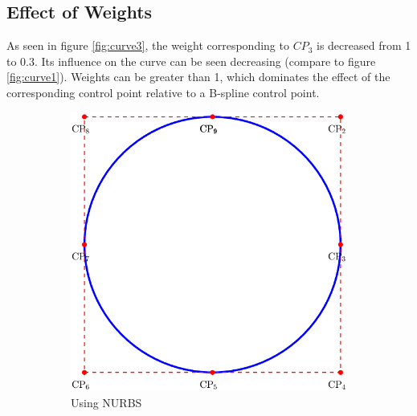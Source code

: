 \documentclass[12pt, a4paper]{report}
\begin{document}
\subsection{Effect of Weights}
As seen in figure \ref{fig:curve3}, the weight corresponding to $CP_3$ is decreased from 1 to 0.3. Its influence on the curve can be seen decreasing (compare to figure \ref{fig:curve1}). Weights can be greater than 1, which dominates the effect of the corresponding control point relative to a B-spline control point.
\begin{figure}[H]
\centering
\begin{subfigure}{0.4\textwidth}
  \centering
  \includegraphics[width=\linewidth]{Images/cir1.png}
  \caption{Using NURBS}
  \label{fig:simple_cir}
\end{subfigure}\hfill
\begin{subfigure}{0.4\textwidth}
  \centering

\end{subfigure}
\end{figure}
\end{document}
